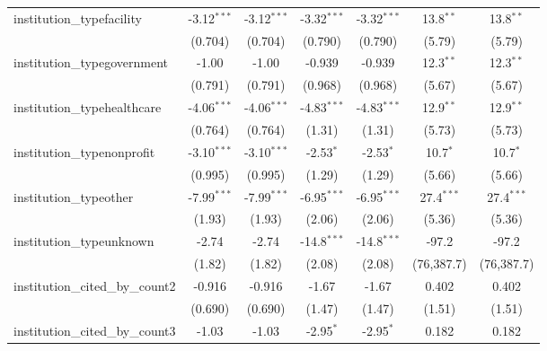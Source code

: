\begin{tabular}{lcccccc}
   institution\_typefacility             & -3.12$^{***}$ & -3.12$^{***}$ & -3.32$^{***}$ & -3.32$^{***}$ & 13.8$^{**}$  & 13.8$^{**}$\\   
                                         & (0.704)       & (0.704)       & (0.790)       & (0.790)       & (5.79)       & (5.79)\\   
   institution\_typegovernment           & -1.00         & -1.00         & -0.939        & -0.939        & 12.3$^{**}$  & 12.3$^{**}$\\   
                                         & (0.791)       & (0.791)       & (0.968)       & (0.968)       & (5.67)       & (5.67)\\   
   institution\_typehealthcare           & -4.06$^{***}$ & -4.06$^{***}$ & -4.83$^{***}$ & -4.83$^{***}$ & 12.9$^{**}$  & 12.9$^{**}$\\   
                                         & (0.764)       & (0.764)       & (1.31)        & (1.31)        & (5.73)       & (5.73)\\   
   institution\_typenonprofit            & -3.10$^{***}$ & -3.10$^{***}$ & -2.53$^{*}$   & -2.53$^{*}$   & 10.7$^{*}$   & 10.7$^{*}$\\   
                                         & (0.995)       & (0.995)       & (1.29)        & (1.29)        & (5.66)       & (5.66)\\   
   institution\_typeother                & -7.99$^{***}$ & -7.99$^{***}$ & -6.95$^{***}$ & -6.95$^{***}$ & 27.4$^{***}$ & 27.4$^{***}$\\   
                                         & (1.93)        & (1.93)        & (2.06)        & (2.06)        & (5.36)       & (5.36)\\   
   institution\_typeunknown              & -2.74         & -2.74         & -14.8$^{***}$ & -14.8$^{***}$ & -97.2        & -97.2\\   
                                         & (1.82)        & (1.82)        & (2.08)        & (2.08)        & (76,387.7)   & (76,387.7)\\   
   institution\_cited\_by\_count2        & -0.916        & -0.916        & -1.67         & -1.67         & 0.402        & 0.402\\   
                                         & (0.690)       & (0.690)       & (1.47)        & (1.47)        & (1.51)       & (1.51)\\   
   institution\_cited\_by\_count3        & -1.03         & -1.03         & -2.95$^{*}$   & -2.95$^{*}$   & 0.182        & 0.182\\   

\end{tabular}
